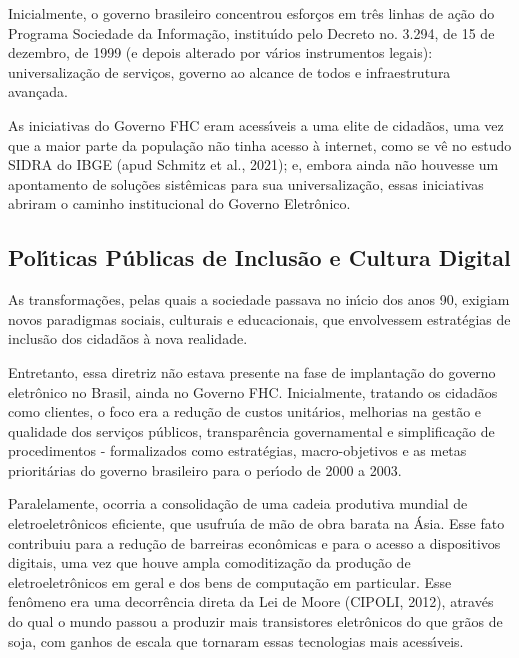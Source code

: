 \documentclass[
12pt,		%
openright,	%
twoside,  %
a4paper,			%
chapter=TITLE,		%
english,			%
french,				%
spanish,			%
brazil				%
]{USPSC-classe/USPSC}
\begin{document}
Inicialmente, o governo brasileiro concentrou esfor\c{c}os em tr\^es linhas de a\c{c}\~ao do Programa Sociedade da Informa\c{c}\~ao, institu\'{\i}do pelo Decreto no. 3.294, de 15 de dezembro, de 1999 (e depois alterado por v\'arios instrumentos legais): universaliza\c{c}\~ao de servi\c{c}os, governo ao alcance de todos e infraestrutura avan\c{c}ada.








As iniciativas do Governo FHC eram  acess\'{\i}veis a uma elite de cidad\~aos, uma vez que a maior parte da popula\c{c}\~ao n\~ao tinha acesso \`a internet, como se v\^e no estudo SIDRA do IBGE (apud Schmitz et al., 2021); e, embora ainda n\~ao houvesse um apontamento de solu\c{c}\~oes sist\^emicas para sua universaliza\c{c}\~ao, essas iniciativas abriram o caminho institucional do Governo Eletr\^onico.








\subsection[Pol\'{\i}ticas P\'ublicas de Inclus\~ao e Cultura Digital]{Pol\'{\i}ticas P\'ublicas de Inclus\~ao e Cultura Digital}\label{Pol\'{\i}ticas P\'ublicas de Inclus\~ao e Cultura Digital}
As transforma\c{c}\~oes, pelas quais a sociedade passava no in\'{\i}cio dos anos 90, exigiam novos paradigmas sociais, culturais e educacionais, que envolvessem estrat\'egias de inclus\~ao dos  cidad\~aos \`a nova realidade.








Entretanto, essa diretriz n\~ao estava presente na fase de implanta\c{c}\~ao do governo eletr\^onico no Brasil, ainda no Governo FHC. Inicialmente, tratando os cidad\~aos como clientes, o foco era a redu\c{c}\~ao de custos unit\'arios, melhorias na gest\~ao e qualidade dos servi\c{c}os p\'ublicos, transpar\^encia governamental e simplifica\c{c}\~ao de procedimentos - formalizados como estrat\'egias, macro-objetivos e  as metas priorit\'arias  do governo brasileiro para o per\'{\i}odo de 2000 a 2003.








Paralelamente, ocorria a consolida\c{c}\~ao de uma cadeia produtiva mundial de eletroeletr\^onicos eficiente, que usufru\'{\i}a de m\~ao de obra barata na \'Asia. Esse fato contribuiu para a redu\c{c}\~ao de barreiras econ\^omicas e para o acesso a dispositivos digitais, uma vez que houve ampla comoditiza\c{c}\~ao da produ\c{c}\~ao de eletroeletr\^onicos em geral e dos bens de computa\c{c}\~ao em particular. Esse fen\^omeno era uma decorr\^encia direta da Lei de Moore (CIPOLI, 2012), atrav\'es do qual o mundo passou a produzir mais transistores eletr\^onicos do que gr\~aos de soja, com ganhos de escala que tornaram essas tecnologias mais acess\'{\i}veis.
\end{document}
